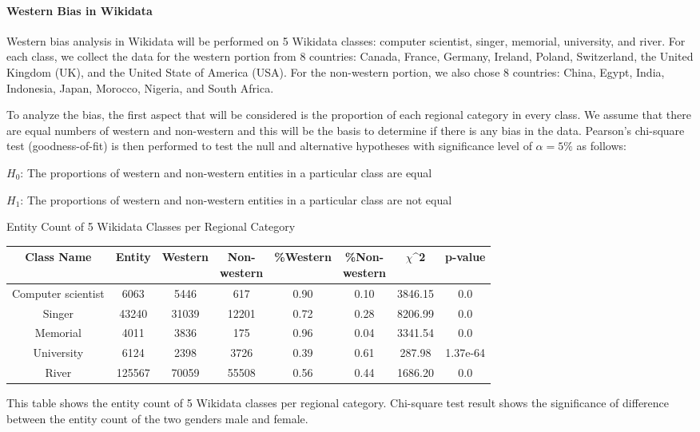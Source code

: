 \paragraph{Western Bias in Wikidata}

Western bias analysis in Wikidata will be performed on 5 Wikidata classes: computer scientist, singer, memorial, university, and river. For each class, we collect the data for the western portion from 8 countries: Canada, France, Germany, Ireland, Poland, Switzerland, the United Kingdom (UK), and the United State of America (USA). For the non-western portion, we also chose 8 countries: China, Egypt, India, Indonesia, Japan, Morocco, Nigeria, and South Africa.

To analyze the bias, the first aspect that will be considered is the proportion of each regional category in every class. We assume that there are equal numbers of western and non-western and this will be the basis to determine if there is any bias in the data. Pearson's chi-square test (goodness-of-fit) is then performed to test the null and alternative hypotheses with significance level of \(\alpha=5\%\) as follows:

\(H_0\): The proportions of western and non-western entities in a particular class are equal

\(H_1\): The proportions of western and non-western entities in a particular class are not equal


\begin{center}
\small
\begin{threeparttable}
\caption{Entity Count of 5 Wikidata Classes per Regional Category}
\label{tab:western - entity count}
\begin{tabular}{c | c c c c c c c} 

\toprule
    Class Name & Entity & Western & \CellWithForceBreak{Non- \\ western} & \%Western & \CellWithForceBreak{\%Non- \\ western}& $\chi$^2 & p-value \\ [0.5ex] 
\midrule
    Computer scientist & 6063 & 5446 & 617 & 0.90 & 0.10 & 3846.15 & 0.0 \\
    Singer & 43240 & 31039 & 12201 & 0.72 & 0.28 & 8206.99 & 0.0 \\
    Memorial & 4011 & 3836 & 175 & 0.96 & 0.04 & 3341.54 & 0.0 \\
    University & 6124 & 2398 & 3726 & 0.39 & 0.61 & 287.98 & 1.37e-64 \\
    River & 125567 & 70059 & 55508 & 0.56 & 0.44 & 1686.20 & 0.0 \\
    [1ex]
\bottomrule
\end{tabular}
\begin{tablenotes}
    \footnotesize
    This table shows the entity count of 5 Wikidata classes per regional category. Chi-square test result shows the significance of difference between the entity count of the two genders male and female.
\end{tablenotes}
\end{threeparttable}
\end{center}

